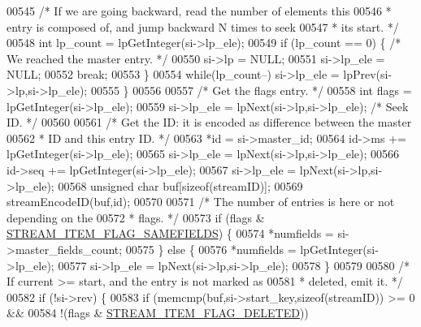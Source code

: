 \begin{DoxyCode}
{00545                 \textcolor{comment}{/* If we are going backward, read the number of elements this}
00546 \textcolor{comment}{                 * entry is composed of, and jump backward N times to seek}
00547 \textcolor{comment}{                 * its start. */}
00548                 \textcolor{keywordtype}{int} lp\_count = lpGetInteger(si->lp\_ele);
00549                 \textcolor{keywordflow}{if} (lp\_count == 0) \{ \textcolor{comment}{/* We reached the master entry. */}
00550                     si->lp = NULL;
00551                     si->lp\_ele = NULL;
00552                     \textcolor{keywordflow}{break};
00553                 \}
00554                 \textcolor{keywordflow}{while}(lp\_count--) si->lp\_ele = lpPrev(si->lp,si->lp\_ele);
00555             \}
00556 
00557             \textcolor{comment}{/* Get the flags entry. */}
00558             \textcolor{keywordtype}{int} flags = lpGetInteger(si->lp\_ele);
00559             si->lp\_ele = lpNext(si->lp,si->lp\_ele); \textcolor{comment}{/* Seek ID. */}
00560 
00561             \textcolor{comment}{/* Get the ID: it is encoded as difference between the master}
00562 \textcolor{comment}{             * ID and this entry ID. */}
00563             *id = si->master\_id;
00564             id->ms += lpGetInteger(si->lp\_ele);
00565             si->lp\_ele = lpNext(si->lp,si->lp\_ele);
00566             id->seq += lpGetInteger(si->lp\_ele);
00567             si->lp\_ele = lpNext(si->lp,si->lp\_ele);
00568             \textcolor{keywordtype}{unsigned} \textcolor{keywordtype}{char} buf[\textcolor{keyword}{sizeof}(streamID)];
00569             streamEncodeID(buf,id);
00570 
00571             \textcolor{comment}{/* The number of entries is here or not depending on the}
00572 \textcolor{comment}{             * flags. */}
00573             \textcolor{keywordflow}{if} (flags & \hyperlink{t__stream_8c_a6977b456a646762a7650d432a06dc6c5}{STREAM\_ITEM\_FLAG\_SAMEFIELDS}) \{
00574                 *numfields = si->master\_fields\_count;
00575             \} \textcolor{keywordflow}{else} \{
00576                 *numfields = lpGetInteger(si->lp\_ele);
00577                 si->lp\_ele = lpNext(si->lp,si->lp\_ele);
00578             \}
00579 
00580             \textcolor{comment}{/* If current >= start, and the entry is not marked as}
00581 \textcolor{comment}{             * deleted, emit it. */}
00582             \textcolor{keywordflow}{if} (!si->rev) \{
00583                 \textcolor{keywordflow}{if} (memcmp(buf,si->start\_key,\textcolor{keyword}{sizeof}(streamID)) >= 0 &&
00584                     !(flags & \hyperlink{t__stream_8c_ad2bde2408044756f3f418ae3c72e575f}{STREAM\_ITEM\_FLAG\_DELETED}))
}
\end{DoxyCode}
